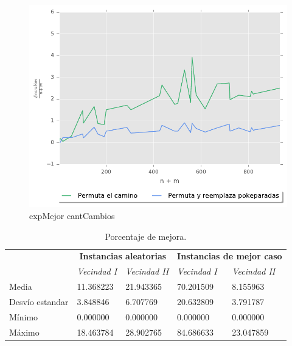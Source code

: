 \begin{figure}[H]
  \begin{center}
    \includegraphics{../experimentacion/ej3/expMejor_cantCambios.pdf}
    \caption{expMejor cantCambios}
    \label{fig:expMejor_cantCambios}
  \end{center}
\end{figure}

\begin{table}[H]
    \begin{center}
        \begin{tabular}{ | l | l | l | l | l | }
            \hline
            \multicolumn{1}{|c|}{}&
            \multicolumn{2}{|c|}{\textbf{Instancias aleatorias}}&
            \multicolumn{2}{|c|}{\textbf{Instancias de mejor caso}}\\
            \cline{2-5}
                            &    \textit{Vecindad I}     &    \textit{Vecindad II}    &    \textit{Vecindad I}     &    \textit{Vecindad II}    \\ \hline
            Media           &    11.368223  &   21.943365   &   70.201509   &    8.155963   \\ \hline
            Desv\'io estandar       &   3.848846    &    6.707769   &   20.632809   &   3.791787    \\ \hline
            M\'inimo        &   0.000000    &    0.000000   &   0.000000    &   0.000000    \\ \hline
            M\'aximo        &   18.463784   &    28.902765  &       84.686633   &    23.047859  \\ \hline
        \end{tabular}
    \end{center}
    \caption{Porcentaje de mejora.}    
    \label{table:porcentaje_mejora}
\end{table} 

